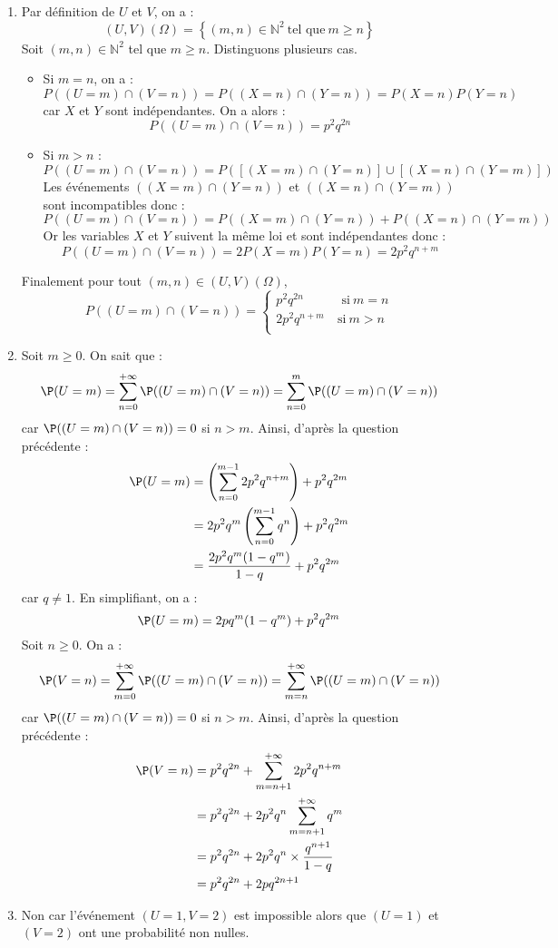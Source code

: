 \documentclass[a4paper,10pt]{report}
\begin{document}
\begin{enumerate}
\item Par définition de $U$ et $V$, on a :
$$(U,V)(\Omega)=\left\lbrace (m,n)\in\mathbb{N}^2\:\text{tel que}\: m\geqslant n\right\rbrace$$
Soit $(m,n)\in\mathbb{N}^2$ tel que $m\geqslant n$. Distinguons plusieurs cas.
\begin{itemize}
\item Si $m=n$, on a :
$$P((U=m)\cap(V=n))=P((X=n)\cap(Y=n))=P(X=n)P(Y=n)$$
car $X$ et $Y$ sont indépendantes. On a alors :
$$P((U=m)\cap(V=n))=p^2q^{2n}$$
\item Si $m>n$ :
$$P((U=m)\cap(V=n))=P(\left[  (X=m)\cap(Y=n)\right]  \cup \left[  (X=n)\cap(Y=m)\right] )$$
Les événements $\left( (X=m)\cap(Y=n)\right)$ et  $\left( (X=n)\cap(Y=m)\right)$ sont incompatibles donc :
$$P((U=m)\cap(V=n))=P\left( (X=m)\cap(Y=n)\right)+P\left( (X=n)\cap(Y=m)\right)$$
Or les variables $X$ et $Y$ suivent la même loi et sont indépendantes donc :
$$P((U=m)\cap (V=n))=2P (X=m)P(Y=n)=2p^2q^{n+m}$$
\end{itemize} 
Finalement pour tout $(m,n) \in (U,V)(\Omega)$,
$$P((U=m)\cap (V=n))=\left\lbrace 
\begin{array}{ll}
p^2q^{2n}&\:\text{ si}\: m=n\\
2p^2q^{n+m} &\:\text{si}\: m>n\\
\end{array}
\right.$$
\item Soit $m \geq 0$. On sait que :
$$ \P(U=m) = \sum_{n=0}^{+ \infty} \P((U=m)\cap (V=n)) = \sum_{n=0}^{m} \P((U=m)\cap (V=n))$$
car $\P((U=m)\cap (V=n))=0$ si $n>m$. Ainsi, d'après la question précédente :
\begin{align*}
 \P(U=m) & = \left(\sum_{n=0}^{m-1}  2p^2q^{n+m}\right) + p^2q^{2m}\\
 & = 2p^2 q^m \left(\sum_{n=0}^{m-1}  q^n \right) +  p^2q^{2m}\\
 & = \dfrac{2p^2q^m (1-q^m)}{1-q} + p^2q^{2m}
 \end{align*}
 car $q \neq 1$. En simplifiant, on a :
 $$ \P(U=m) = 2pq^m (1-q^m) + p^2 q^{2m}$$
 Soit $n \geq 0$. On a :
$$ \P(V=n) = \sum_{m=0}^{+ \infty} \P((U=m)\cap (V=n)) = \sum_{m=n}^{+\infty} \P((U=m)\cap (V=n))$$
car $\P((U=m)\cap (V=n))=0$ si $n>m$. Ainsi, d'après la question précédente :
\begin{align*}
\P(V=n) & = p^2q^{2n} + \sum_{m=n+1}^{+\infty} 2p^2q^{n+m} \\
& = p^2q^{2n} + 2p^2 q^n \sum_{m=n+1}^{+\infty} q^m \\
& =  p^2q^{2n} + 2p^2 q^n \times \dfrac{q^{n+1}}{1-q} \\
& = p^2q^{2n} + 2pq^{2n+1}
\end{align*}
\item Non car l'événement $(U=1,V=2)$ est impossible alors que $(U=1)$ et $(V=2)$ ont une probabilité non nulles.
\end{enumerate}
\end{document}
